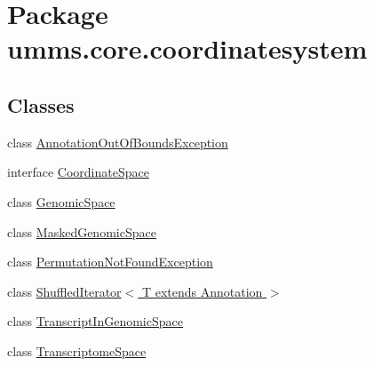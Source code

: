 \hypertarget{namespaceumms_1_1core_1_1coordinatesystem}{\section{Package umms.\+core.\+coordinatesystem}
\label{namespaceumms_1_1core_1_1coordinatesystem}
}
\subsection*{Classes}
\begin{DoxyCompactItemize}
\item 
class \hyperlink{classumms_1_1core_1_1coordinatesystem_1_1_annotation_out_of_bounds_exception}{Annotation\+Out\+Of\+Bounds\+Exception}
\item 
interface \hyperlink{interfaceumms_1_1core_1_1coordinatesystem_1_1_coordinate_space}{Coordinate\+Space}
\item 
class \hyperlink{classumms_1_1core_1_1coordinatesystem_1_1_genomic_space}{Genomic\+Space}
\item 
class \hyperlink{classumms_1_1core_1_1coordinatesystem_1_1_masked_genomic_space}{Masked\+Genomic\+Space}
\item 
class \hyperlink{classumms_1_1core_1_1coordinatesystem_1_1_permutation_not_found_exception}{Permutation\+Not\+Found\+Exception}
\item 
class \hyperlink{classumms_1_1core_1_1coordinatesystem_1_1_shuffled_iterator_3_01_t_01extends_01_annotation_01_4}{Shuffled\+Iterator$<$ T extends Annotation $>$}
\item 
class \hyperlink{classumms_1_1core_1_1coordinatesystem_1_1_transcript_in_genomic_space}{Transcript\+In\+Genomic\+Space}
\item 
class \hyperlink{classumms_1_1core_1_1coordinatesystem_1_1_transcriptome_space}{Transcriptome\+Space}
\end{DoxyCompactItemize}
